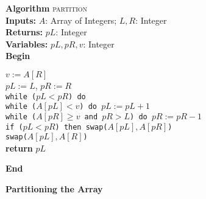 \documentclass[a4paper,12pt]{article}
\begin{document}
\textbf{Algorithm} \textsc{partition} \\
\textbf{Inputs:} \(A\): Array of Integers; \(L, R\): Integer \\
\textbf{Returns:} \(pL\): Integer \\
\textbf{Variables:} \(pL, pR, v\): Integer \\

\textbf{Begin}
\begin{tcolorbox}[colframe=black, colback=white]
\(v := A[R]\) \\
\(pL := L\), \(pR := R\) \\

\texttt{while (\(pL < pR\)) do} \\
\hspace*{1cm}\texttt{while (\(A[pL] < v\)) do \(pL := pL + 1\)} \\
\hspace*{1cm}\texttt{while (\(A[pR] \geq v\) and \(pR > L\)) do \(pR := pR - 1\)} \\
\hspace*{1cm}\texttt{if (\(pL < pR\)) then swap(\(A[pL], A[pR]\))} \\
\texttt{swap(\(A[pL], A[R]\))} \\
\textbf{return} \(pL\)
\end{tcolorbox}
\textbf{End}

\begin{center}
\Large\textbf{Partitioning the Array}
\end{center}

\vspace{1em}
\end{document}
